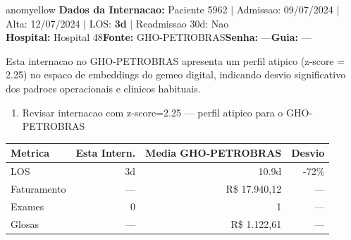 \documentclass[a4paper,10pt]{article}
\begin{document}
\begin{anomalycard}[Internacao 97412 | GHO-PETROBRAS | MODERADO (z=2.25)]{anomyellow}
\textbf{Dados da Internacao:} Paciente 5962 $\mid$ Admissao: 09/07/2024 $\mid$ Alta: 12/07/2024 $\mid$ LOS: \textbf{3d} $\mid$ Readmissao 30d: Nao\\
\textbf{Hospital:} Hospital 48\quad\textbf{Fonte:} GHO-PETROBRAS\quad\textbf{Senha:} ---\quad\textbf{Guia:} ---\\
\vspace{2pt}\begin{tcolorbox}[colback=severityred!20,colframe=anomyellow,title={\textbf{Interpretacao de Negocio}},fonttitle=\bfseries\small,left=4pt,right=4pt,top=3pt,bottom=3pt]
{\small Esta internacao no GHO-PETROBRAS apresenta um perfil atipico (z-score = 2.25) no espaco de embeddings do gemeo digital, indicando desvio significativo dos padroes operacionais e clinicos habituais.}
\end{tcolorbox}
\begin{tcolorbox}[colback=severityyellow!30,colframe=anomorange,title={\textbf{Recomendacoes Especificas}},fonttitle=\bfseries\small,left=4pt,right=4pt,top=3pt,bottom=3pt]
\begin{enumerate}[nosep,leftmargin=16pt]
\item {\small Revisar internacao com z-score=2.25 --- perfil atipico para o GHO-PETROBRAS}
\end{enumerate}
\end{tcolorbox}
\begin{center}\begin{tabular}{l r r r}\toprule\textbf{Metrica} & \textbf{Esta Intern.} & \textbf{Media GHO-PETROBRAS} & \textbf{Desvio} \\\midrule
LOS & 3d & 10.9d & -72\% \\
Faturamento & --- & R\$ 17.940,12 & --- \\
Exames & 0 & 1 & --- \\
Glosas & --- & R\$ 1.122,61 & --- \\
\bottomrule\end{tabular}\end{center}


\end{anomalycard}
\end{document}
